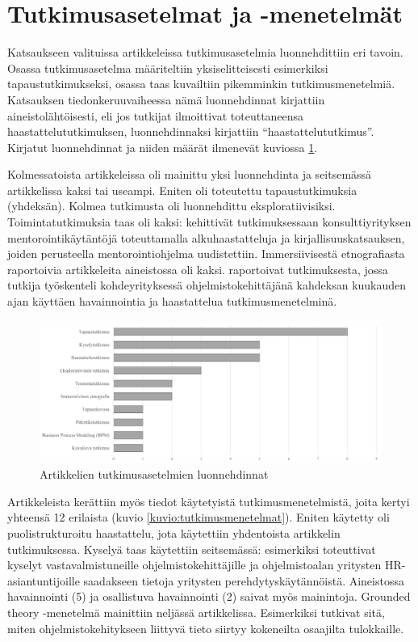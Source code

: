 \documentclass[utf8]{gradu3}
\begin{document}
\section{Tutkimusasetelmat ja -menetelmät}
\label{luku-tulokset-tutkimustyypit-ja-menetelmat}

Katsaukseen valituissa artikkeleissa tutkimusasetelmia luonnehdittiin eri tavoin.
Osassa tutkimusasetelma määriteltiin yksiselitteisesti esimerkiksi tapaustutkimukseksi, osassa taas kuvailtiin pikemminkin tutkimusmenetelmiä. Katsauksen tiedonkeruuvaiheessa nämä luonnehdinnat kirjattiin aineistolähtöisesti, eli jos tutkijat ilmoittivat toteuttaneensa haastattelututkimuksen, luonnehdinnaksi kirjattiin ``haastattelututkimus''. Kirjatut luonnehdinnat ja niiden määrät ilmenevät kuviossa \ref{kuvio:tutkimustyypit}. 

Kolmessatoista artikkeleissa oli mainittu yksi luonnehdinta ja seitsemässä artikkelissa kaksi tai useampi. Eniten oli toteutettu tapaustutkimuksia (yhdeksän). Kolmea tutkimusta oli luonnehdittu eksploratiivisiksi. Toimintatutkimuksia taas oli kaksi: \textcite{bjornson-dingsøyr-2005} kehittivät tutkimuksessaan konsulttiyrityksen mentorointikäytäntöjä toteuttamalla alkuhaastatteluja ja kirjallisuuskatsauksen, joiden perusteella mentorointiohjelma uudistettiin. Immersiivisestä etnografiasta raportoivia artikkeleita aineistossa oli kaksi. \textcite{kumar-ym-2016} raportoivat tutkimuksesta, jossa tutkija työskenteli kohdeyrityksessä ohjelmistokehittäjänä kahdeksan kuukauden ajan käyttäen havainnointia ja haastattelua tutkimusmenetelminä.

\begin{figure}[h]
    \centering
    \includegraphics[width=\textwidth]{media/tutkimusasetelmat.png}
    \caption{Artikkelien tutkimusasetelmien luonnehdinnat}
    \label{kuvio:tutkimustyypit}
\end{figure}

Artikkeleista kerättiin myös tiedot käytetyistä tutkimusmenetelmistä, joita kertyi yhteensä 12 erilaista (kuvio \ref{kuvio:tutkimusmenetelmat}). Eniten käytetty oli puolistrukturoitu haastattelu, jota käytettiin yhdentoista artikkelin tutkimuksessa. Kyselyä taas käytettiin seitsemässä: esimerkiksi \textcite{kulkarni-ym-2010} toteuttivat kyselyt vastavalmistuneille ohjelmistokehittäjille ja ohjelmistoalan yritysten HR-asiantuntijoille saadakseen tietoja yritysten perehdytyskäytännöistä. Aineistossa havainnointi (5) ja osallistuva havainnointi (2) saivat myös mainintoja. Grounded theory -menetelmä mainittiin neljässä artikkelissa. Esimerkiksi \textcite{viana-ym-2014} tutkivat sitä, miten ohjelmistokehitykseen liittyvä tieto siirtyy kokeneilta osaajilta tulokkaille. 
\end{document}
